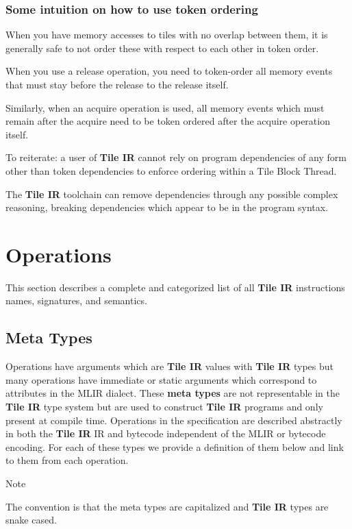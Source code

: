 \documentclass{article}
\begin{document}
\subsubsection{Some intuition on how to use token ordering}

When you have memory accesses to tiles with no overlap between them, it is generally safe to not order these with respect to each other in token order.

When you use a release operation, you need to token-order all memory events that must stay before the release to the release itself.

Similarly, when an acquire operation is used, all memory events which must remain after the acquire need to be token ordered after the acquire operation itself.


To reiterate: a user of \textbf{Tile IR} cannot rely on program dependencies of any form other than token dependencies to enforce ordering within a Tile Block Thread.

The \textbf{Tile IR} toolchain can remove dependencies through any possible complex reasoning, breaking dependencies which appear to be in the program syntax.


\newpage
\section{Operations}

This section describes a complete and categorized list of all \textbf{Tile IR} instructions names, signatures, and semantics.


\subsection{Meta Types}

Operations have arguments which are \textbf{Tile IR} values with \textbf{Tile IR} types but many operations have immediate or static arguments which correspond to attributes in the MLIR dialect. These \textbf{meta types} are not representable in the \textbf{Tile IR} type system but are used to construct \textbf{Tile IR} programs and only present at compile time. Operations in the specification are described abstractly in both the \textbf{Tile IR} IR and bytecode independent of the MLIR or bytecode encoding. For each of these types we provide a definition of them below and link to them from each operation.


Note


The convention is that the meta types are capitalized and \textbf{Tile IR} types are snake cased.
\end{document}
